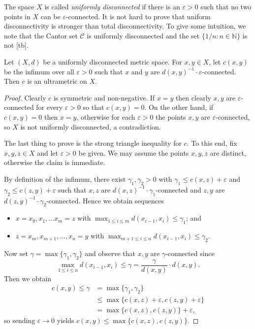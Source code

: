 The space \( X \) is called \emph{uniformly disconnected} if there is an \( \varepsilon > 0 \) such that no two points in \( X \) can be \( \varepsilon  \)-connected. It is not hard to prove that uniform disconnectivity is stronger than total disconnectivity. To give some intuition, we note that the Cantor set \( \mathcal{C}  \) is uniformly disconnected and the set \( \{ 1/n : n \in \mathbb{N}  \}  \) is not [tb].


Let \( (X,d) \) be a uniformly disconnected metric space. For \( x,y \in X \), let \( c(x,y) \) be the infimum over all \( \varepsilon > 0 \) such that \( x \) and \( y \) are \( d(x,y)^{-1} \cdot \varepsilon  \)-connected. Then \( c \) is an ultrametric on \( X \).
\begin{proof}
Clearly \( c \) is symmetric and non-negative. If \( x = y \) then clearly \( x,y \) are \( \varepsilon  \)-connected for every \( \varepsilon > 0 \) so that \( c(x,y) = 0 \). On the other hand, if \( c(x,y) = 0  \) then \( x = y \), otherwise for each \( \varepsilon > 0 \) the points \( x,y \) are \( \varepsilon  \)-connected, so \( X \) is not uniformly disconnected, a contradiction.

The last thing to prove is the strong triangle inequality for \( c \). To this end, fix \( x,y,z \in X \) and let \( \varepsilon > 0 \) be given. We may assume the points \( x,y,z \) are distinct, otherwise the claim is immediate.

By definition of the infimum, there exist \( \gamma_1, \gamma_2 > 0 \) with \( \gamma_1 \leq c(x,z) + \varepsilon  \) and \( \gamma_2 \leq c(z,y) + \varepsilon  \) such that \( x,z \) are \( d(x,z)^{-1} \cdot \gamma_1 \)-connected and \( z,y \) are \(d(z,y)^{-1} \cdot \gamma_2 \)-connected. Hence we obtain sequences
\begin{itemize}[leftmargin=1.2cm]
	\item \( x = x_0, x_1, \hdots x_{m} = z  \) with \( \max_{1 \leq i \leq m} d(x_{i-1} , x_{i}) \leq \gamma_1 \); and
	\item \( z = x_{m} , x_{m+1} , \hdots , x_{n} = y \) with \( \max_{m+1 \leq i \leq n} d(x_{i-1} , x_{i}) \leq \gamma_2 \). 
\end{itemize}
Now set \( \gamma = \max \{ \gamma_1, \gamma_2 \}  \) and observe that \( x,y \) are \( \gamma \)-connected since \[ \max _{1 \leq i \leq n} d(x_{i-1} , x_{i} ) \leq \gamma = \frac{\gamma}{d(x,y)} \cdot d(x,y). \] 
Then we obtain
\begin{align*}
	c(x,y) \leq \gamma &= \max \{ \gamma_1, \gamma_2 \} \\
	       &\leq \max \{ c(x,z) + \varepsilon , c(z,y) + \varepsilon  \} \\
	       &= \max \{ c(x,z), c(z,y) \} + \varepsilon,
\end{align*}
so sending \( \varepsilon \to 0 \) yields \( c(x,y) \leq \max \{ c(x,z), c(z,y) \} \).
\end{proof}
